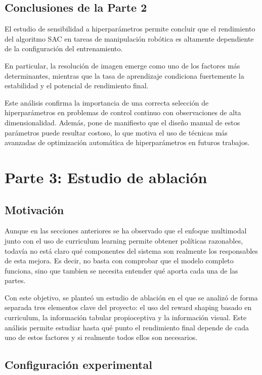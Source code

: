 \documentclass[10pt,twocolumn]{article}
\begin{document}
\subsection{Conclusiones de la Parte 2}

El estudio de sensibilidad a hiperparámetros permite concluir que el rendimiento del algoritmo SAC en tareas de manipulación robótica es altamente dependiente de la configuración del entrenamiento.

En particular, la resolución de imagen emerge como uno de los factores más determinantes, mientras que la tasa de aprendizaje condiciona fuertemente la estabilidad y el potencial de rendimiento final.

Este análisis confirma la importancia de una correcta selección de hiperparámetros en problemas de control continuo con observaciones de alta dimensionalidad. Además, pone de manifiesto que el diseño manual de estos parámetros puede resultar costoso, lo que motiva el uso de técnicas más avanzadas de optimización automática de hiperparámetros en futuros trabajos.

\section{Parte 3: Estudio de ablación}

\subsection{Motivación}

Aunque en las secciones anteriores se ha observado que el enfoque multimodal junto con el uso de curriculum learning permite obtener políticas razonables, todavía no está claro qué componentes del sistema son realmente los responsables de esta mejora. Es decir, no basta con comprobar que el modelo completo funciona, sino que tambien se necesita entender qué aporta cada una de las partes.

Con este objetivo, se planteó un estudio de ablación en el que se analizó de forma separada tres elementos clave del proyecto: el uso del reward shaping basado en curriculum, la información tabular propioceptiva y la información visual. Este análisis permite estudiar hasta qué punto el rendimiento final depende de cada uno de estos factores y si realmente todos ellos son necesarios.

\subsection{Configuración experimental}
\end{document}
